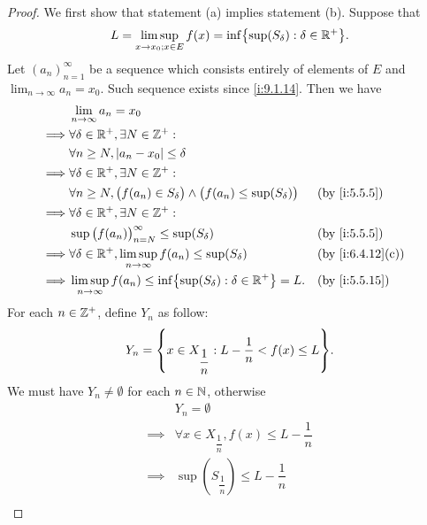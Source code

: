 \begin{proof}
  We first show that statement (a) implies statement (b).
  Suppose that
  \[
    L = \limsup_{x \to x_0 ; x \in E} f(x) = \inf\set{\sup(S_\delta) : \delta \in \R^+}.
  \]
  Let \((a_n)_{n = 1}^\infty\) be a sequence which consists entirely of elements of \(E\) and \(\lim_{n \to \infty} a_n = x_0\).
  Such sequence exists since \cref{i:9.1.14}.
  Then we have
  \begin{align*}
             & \lim_{n \to \infty} a_n = x_0                                                                                        \\
    \implies & \forall \delta \in \R^+, \exists N \in \Z^+ :                                                                        \\
             & \forall n \geq N, \abs{a_n - x_0} \leq \delta                                                                        \\
    \implies & \forall \delta \in \R^+, \exists N \in \Z^+ :                                                                        \\
             & \forall n \geq N, \big(f(a_n) \in S_{\delta}\big) \land \big(f(a_n) \leq \sup(S_{\delta})\big) &  & \by{i:5.5.5}     \\
    \implies & \forall \delta \in \R^+, \exists N \in \Z^+ :                                                                        \\
             & \sup\big(f(a_n)\big)_{n = N}^\infty \leq \sup(S_{\delta})                                      &  & \by{i:5.5.5}     \\
    \implies & \forall \delta \in \R^+, \limsup_{n \to \infty} f(a_n) \leq \sup(S_{\delta})                   &  & \by{i:6.4.12}[c] \\
    \implies & \limsup_{n \to \infty} f(a_n) \leq \inf\set{\sup(S_{\delta}) : \delta \in \R^+} = L.           &  & \by{i:5.5.15}
  \end{align*}
  For each \(n \in \mathbb{Z}^+\), define \(Y_n\) as follow:
  \[
    Y_n = \set{x \in X_{\dfrac{1}{n}} : L - \dfrac{1}{n} < f(x) \leq L}.
  \]
  We must have \(Y_n \neq \emptyset\) for each \(n \in \mathbb{N}\), otherwise
  \begin{align*}
             & Y_n = \emptyset                                                                                     \\
    \implies & \forall x \in X_{\dfrac{1}{n}}, f(x) \leq L - \dfrac{1}{n}                                          \\
    \implies & \sup(S_{\dfrac{1}{n}}) \leq L - \dfrac{1}{n}                                                        \\

\end{align*}
\end{proof}
